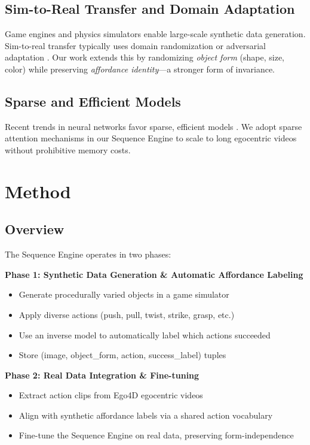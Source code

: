 \documentclass[11pt]{article}
\begin{document}
\subsection{Sim-to-Real Transfer and Domain Adaptation}

Game engines and physics simulators enable large-scale synthetic data generation. Sim-to-real transfer typically uses domain randomization \cite{tobin2017domain, peng2018sim} or adversarial adaptation \cite{ganin2015unsupervised}. Our work extends this by randomizing \textit{object form} (shape, size, color) while preserving \textit{affordance identity}—a stronger form of invariance.

\subsection{Sparse and Efficient Models}

Recent trends in neural networks favor sparse, efficient models \cite{han2016deep, zhou2021efficient}. We adopt sparse attention mechanisms in our Sequence Engine to scale to long egocentric videos without prohibitive memory costs.

\section{Method}

\subsection{Overview}

The Sequence Engine operates in two phases:

\textbf{Phase 1: Synthetic Data Generation \& Automatic Affordance Labeling}
\begin{itemize}
    \item Generate procedurally varied objects in a game simulator
    \item Apply diverse actions (push, pull, twist, strike, grasp, etc.)
    \item Use an inverse model to automatically label which actions succeeded
    \item Store (image, object\_form, action, success\_label) tuples
\end{itemize}

\textbf{Phase 2: Real Data Integration \& Fine-tuning}
\begin{itemize}
    \item Extract action clips from Ego4D egocentric videos
    \item Align with synthetic affordance labels via a shared action vocabulary
    \item Fine-tune the Sequence Engine on real data, preserving form-independence
\end{itemize}
\end{document}
